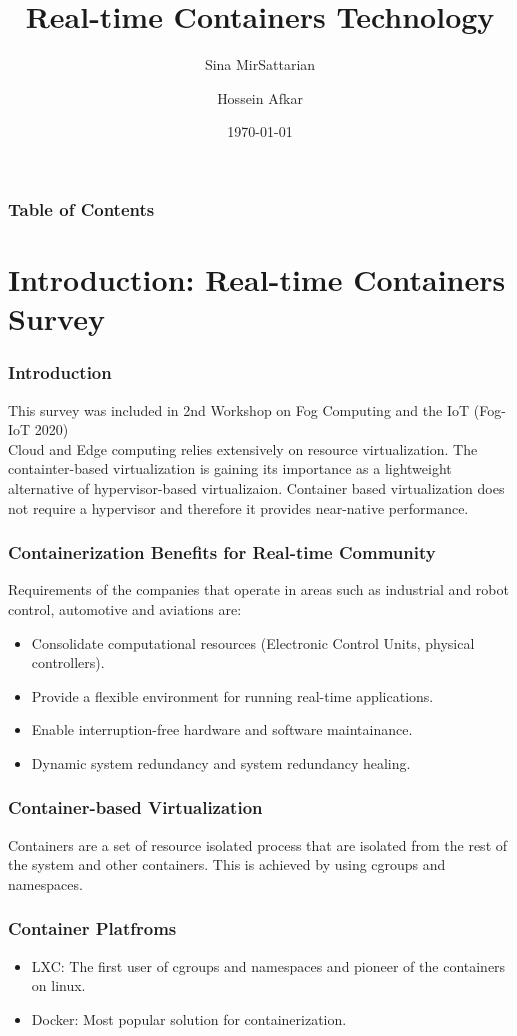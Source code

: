 \documentclass{beamer}
\title{Real-time Containers Technology}
\author[MirSattarian, Afkar]{Sina MirSattarian \and Hossein Afkar}
\institute{University of Tehran}
\date{\today}
\begin{document}
\frame{\titlepage}

\begin{frame}
    \frametitle{Table of Contents}
    \tableofcontents[hideallsubsections]
\end{frame}

\section{Introduction: Real-time Containers Survey}
\begin{frame}
    \frametitle{Introduction}
    This survey was included in 2nd Workshop on Fog Computing and the IoT
    (Fog-IoT 2020) \cite{struhr} \\
    Cloud and Edge computing relies extensively on resource virtualization.
    The containter-based virtualization is gaining its importance as a
    lightweight alternative of hypervisor-based virtualizaion. Container based
    virtualization does not require a hypervisor and therefore it provides
    near-native performance.
\end{frame}

\begin{frame}
    \frametitle{Containerization Benefits for Real-time Community}
    Requirements of the companies that operate in areas such as industrial
    and robot control, automotive and aviations are:
    \begin{itemize}
        \item Consolidate computational resources (Electronic Control Units,
            physical controllers).
        \item Provide a flexible environment for running real-time applications.
        \item Enable interruption-free hardware and software maintainance.
        \item Dynamic system redundancy and system redundancy healing.
    \end{itemize}
\end{frame}

\begin{frame}
    \frametitle{Container-based Virtualization}
    Containers are a set of resource isolated process that are isolated from
    the rest of the system and other containers.
    This is achieved by using cgroups and namespaces.
\end{frame}

\begin{frame}
    \frametitle{Container Platfroms}
    \begin{itemize}
        \item LXC: The first user of cgroups and namespaces and pioneer of the
            containers on linux.
        \item Docker: Most popular solution for containerization.
    \end{itemize}
\end{frame}
\end{document}
